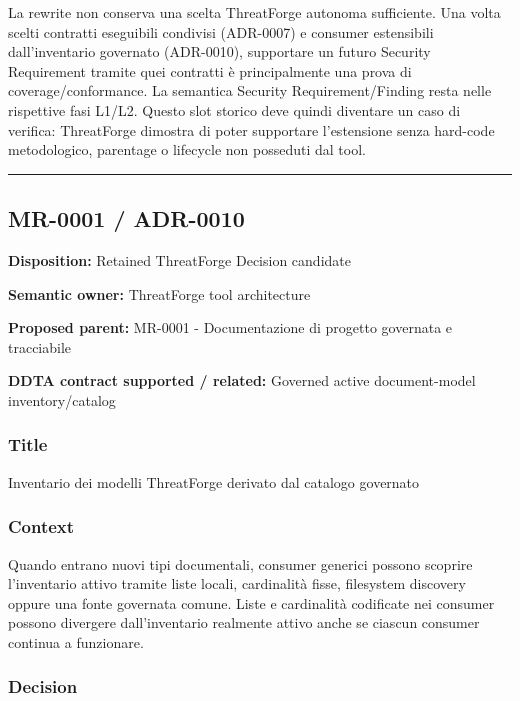 \documentclass[
  10pt,
  a4paper,
]{article}
\begin{document}
La rewrite non conserva una scelta ThreatForge autonoma sufficiente. Una
volta scelti contratti eseguibili condivisi (ADR-0007) e consumer
estensibili dall'inventario governato (ADR-0010), supportare un futuro
Security Requirement tramite quei contratti è principalmente una prova
di coverage/conformance. La semantica Security Requirement/Finding resta
nelle rispettive fasi L1/L2. Questo slot storico deve quindi diventare
un caso di verifica: ThreatForge dimostra di poter supportare
l'estensione senza hard-code metodologico, parentage o lifecycle non
posseduti dal tool.

\begin{center}\rule{0.5\linewidth}{0.5pt}\end{center}

\subsection{MR-0001 / ADR-0010}\label{mr-0001-adr-0010}

\textbf{Disposition:} Retained ThreatForge Decision candidate

\textbf{Semantic owner:} ThreatForge tool architecture

\textbf{Proposed parent:} MR-0001 - Documentazione di progetto governata
e tracciabile

\textbf{DDTA contract supported / related:} Governed active
document-model inventory/catalog

\subsubsection{Title}\label{title-7}

Inventario dei modelli ThreatForge derivato dal catalogo governato

\subsubsection{Context}\label{context-7}

Quando entrano nuovi tipi documentali, consumer generici possono
scoprire l'inventario attivo tramite liste locali, cardinalità fisse,
filesystem discovery oppure una fonte governata comune. Liste e
cardinalità codificate nei consumer possono divergere dall'inventario
realmente attivo anche se ciascun consumer continua a funzionare.

\subsubsection{Decision}\label{decision-7}
\end{document}
